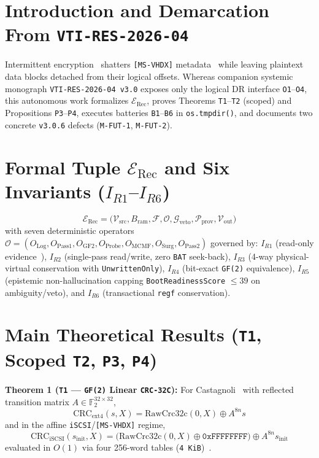 \documentclass[10pt,twocolumn]{article}
\begin{document}
\section{Introduction and Demarcation From \texttt{VTI-RES-2026-04}}

Intermittent encryption~\cite{R07,R08,R09} shatters \texttt{[MS-VHDX]} metadata~\cite{R16} while leaving plaintext data blocks detached from their logical offsets. Whereas companion systemic monograph \texttt{VTI-RES-2026-04 v3.0} exposes only the logical DR interface \texttt{O1}--\texttt{O4}, this autonomous work formalizes $\mathcal{E}_{\mathrm{Rec}}$, proves Theorems \texttt{T1}--\texttt{T2} (scoped) and Propositions \texttt{P3}--\texttt{P4}, executes batteries \texttt{B1}--\texttt{B6} in \texttt{os.tmpdir()}, and documents two concrete \texttt{v3.0.6} defects (\texttt{M-FUT-1}, \texttt{M-FUT-2}).

\section{Formal Tuple $\mathcal{E}_{\mathrm{Rec}}$ and Six Invariants ($I_{R1}$--$I_{R6}$)}

\begin{equation}
\mathcal{E}_{\mathrm{Rec}} = \bigl(\mathcal{V}_{\mathrm{src}}, B_{\mathrm{ram}}, \mathcal{F}, \mathcal{O}, \mathcal{G}_{\mathrm{veto}}, \mathcal{P}_{\mathrm{prov}}, \mathcal{V}_{\mathrm{out}}\bigr)
\end{equation}
with seven deterministic operators $\mathcal{O} = (O_{\mathrm{Log}}, O_{\mathrm{Pass1}}, O_{\mathrm{GF2}}, O_{\mathrm{Probe}}, O_{\mathrm{MCMF}}, O_{\mathrm{Surg}}, O_{\mathrm{Pass2}})$ governed by: $I_{R1}$ (read-only evidence~\cite{R15}), $I_{R2}$ (single-pass read/write, zero \texttt{BAT} seek-back), $I_{R3}$ (4-way physical-virtual conservation with \texttt{UnwrittenOnly}), $I_{R4}$ (bit-exact \texttt{GF(2)} equivalence), $I_{R5}$ (epistemic non-hallucination capping \texttt{BootReadinessScore} $\le 39$ on ambiguity/veto), and $I_{R6}$ (transactional \texttt{regf} conservation).

\section{Main Theoretical Results (\texttt{T1}, Scoped \texttt{T2}, \texttt{P3}, \texttt{P4})}

\textbf{Theorem 1 (\texttt{T1} --- \texttt{GF(2)} Linear \texttt{CRC-32C}):} For Castagnoli~\cite{R01,R02,R03} with reflected transition matrix $A \in \mathbb{F}_2^{32\times 32}$,
\begin{equation}
\mathrm{CRC}_{\mathrm{ext4}}(s,X) = \mathrm{RawCrc32c}(0,X) \oplus A^{8n} s
\end{equation}
and in the affine \texttt{iSCSI}/\texttt{[MS-VHDX]} regime,
\begin{equation}
\mathrm{CRC}_{\mathrm{iSCSI}}(s_{\mathrm{init}},X) = \bigl(\mathrm{RawCrc32c}(0,X) \oplus \texttt{0xFFFFFFFF}\bigr) \oplus A^{8n} s_{\mathrm{init}}
\end{equation}
evaluated in $O(1)$ via four 256-word tables (\texttt{4 KiB})~\cite{R18}.
\end{document}
